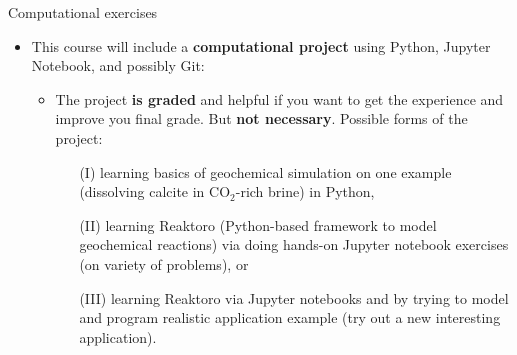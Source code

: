 \begin{frame}{Computational exercises}
\small

\begin{itemize}
\item This course will include a \alert{\textbf{computational project}} using Python, Jupyter Notebook, and possibly Git:
%
\begin{itemize}
\item The project \textbf{is graded} and helpful if you want to get the experience and improve you final grade. But \textbf{not necessary}. 
\pause
Possible forms of the project: 
\begin{itemize}
\item[(I)] learning basics of geochemical simulation on one example (dissolving calcite in CO$_2$-rich brine) in Python, 
\item[(II)] learning Reaktoro (Python-based framework to model geochemical reactions) via doing hands-on Jupyter notebook exercises (on variety of problems), or 
\item[(III)] learning Reaktoro via Jupyter notebooks and by trying to model and program realistic application example (try out a new interesting application). 
\end{itemize}

\end{itemize}
\end{itemize}
\end{frame}
